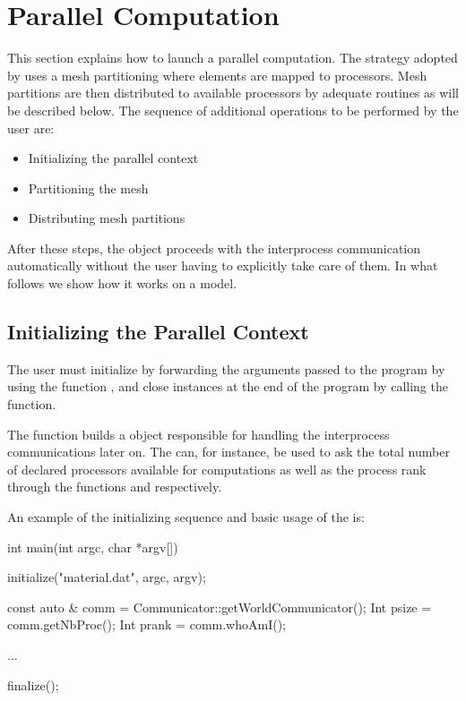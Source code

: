 \chapter{Parallel Computation}

This section explains how to launch a parallel computation.
The strategy adopted by \akantu uses a mesh partitioning
where elements are mapped to processors. Mesh partitions are
then distributed to available processors by adequate routines
as will be described below.
The sequence of additional operations to be performed by the user are:

\begin{itemize}
\item Initializing the parallel context
\item Partitioning the mesh
\item Distributing mesh partitions
\end{itemize}

After these steps, the 
object proceeds with the interprocess communication automatically
without the user having to explicitly take care of them.
In what follows we show how it works on a  model.

\section{Initializing the Parallel Context}

The user must initialize \akantu by forwarding the arguments passed to the
program by using the function , and close \akantu instances
at the end of the program by calling the  function.


The  function builds a  object
responsible for handling the interprocess communications later on.  The
 can, for instance, be used to ask the total number of
declared processors available for computations as well as the process rank
through the functions  and  respectively.

An example of the initializing sequence and basic usage of the
 is:

\begin{cpp}
int main(int argc, char *argv[]) {
  initialize("material.dat", argc, argv);

  const auto & comm = Communicator::getWorldCommunicator();
  Int psize = comm.getNbProc();
  Int prank = comm.whoAmI();

  ...

  finalize();
}
\end{cpp}

